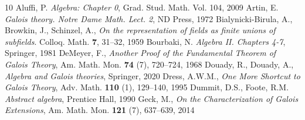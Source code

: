 \documentclass[11pt,reqno]{amsart}
\theoremstyle{standard}
\theoremstyle{definition}
\begin{document}

\begin{thebibliography}{10}
 Aluffi, P. \emph{Algebra: Chapter 0}, Grad. Stud. Math. Vol. 104, 2009
 Artin, E. \emph{Galois theory. Notre Dame Math. Lect. 2}, ND Press, 1972
 Bialynicki-Birula, A., Browkin, J., Schinzel, A., \emph{On the representation of fields as ﬁnite unions of subﬁelds}. Colloq. Math. \textbf{7}, 31--32, 1959
 Bourbaki, N. \emph{Algebra II. Chapters 4-7}, Springer, 1981
 DeMeyer, F., \emph{Another Proof of the Fundamental Theorem of Galois Theory}, Am. Math. Mon. \textbf{74} (7), 720--724, 1968
 Douady, R., Douady, A., \emph{Algebra and Galois theories}, Springer, 2020
 Dress, A.W.M., \emph{One More Shortcut to Galois Theory}, Adv. Math. \textbf{110} (1), 129--140, 1995
 Dummit, D.S., Foote, R.M. \emph{Abstract algebra}, Prentice Hall, 1990
 Geck, M., \emph{On the Characterization of Galois Extensions}, Am. Math. Mon. \textbf{121} (7), 637--639, 2014
\end{thebibliography}
\end{document}
